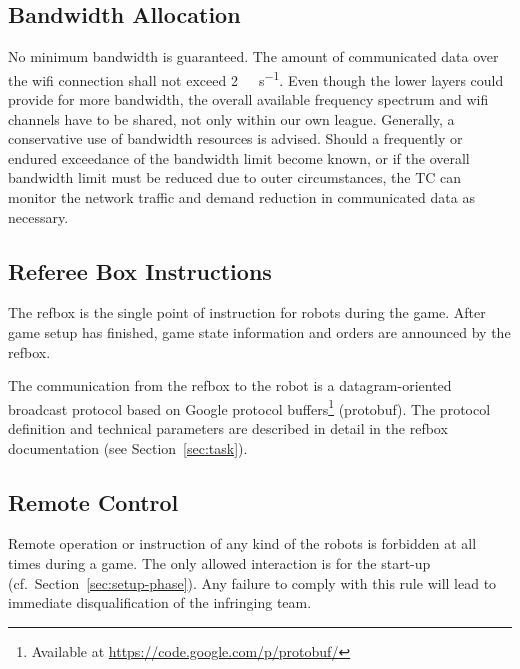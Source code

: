 \documentclass[12pt,twoside]{article}
\newcommand{\refsec}[1]{Section~\ref{#1}}
\begin{document}
\subsection{Bandwidth Allocation}
\label{sec:bandwidth}
No minimum bandwidth is guaranteed. The amount of communicated data
over the wifi connection shall not exceed
\SI[per-mode=symbol]{2}{\mega\bit\per\second}. Even though the lower
layers could provide for more bandwidth, the overall available
frequency spectrum and wifi channels have to be shared, not only
within our own league. Generally, a conservative use of bandwidth
resources is advised. Should a frequently or endured exceedance of the
bandwidth limit become known, or if the overall bandwidth limit must
be reduced due to outer circumstances, the \ac{TC} can monitor the network
traffic and demand reduction in communicated data as necessary.

\subsection{Referee Box Instructions}
\label{sec:referee-box}
The \ac{refbox} is the single point of instruction for robots during the
game. After game setup has finished, game state information and orders
are announced by the \ac{refbox}.

The communication from the \ac{refbox} to the robot is a datagram-oriented
broadcast protocol based on Google protocol buffers\footnote{Available
at \mbox{\url{https://code.google.com/p/protobuf/}}} (protobuf). The
protocol definition and technical parameters are described in detail
in the \ac{refbox} documentation (see \refsec{sec:task}).

\subsection{Remote Control}
\label{sec:remote-control}
Remote operation or instruction of any kind of the robots is forbidden
at all times during a game. The only allowed interaction is for the
start-up (cf.~\refsec{sec:setup-phase}). Any failure to comply with
this rule will lead to immediate disqualification of the infringing
team.
\end{document}
